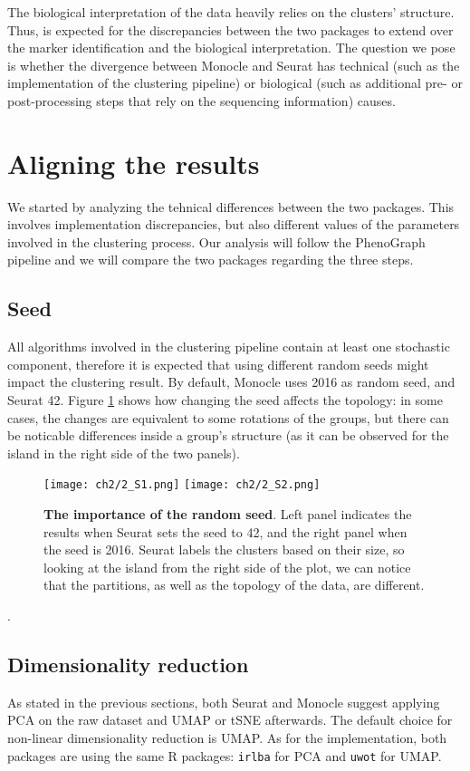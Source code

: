 The biological interpretation of the data heavily relies on the clusters' structure. Thus, is expected for the discrepancies between the two packages to extend over the marker identification and the biological interpretation. The question we pose is whether the divergence between Monocle and Seurat has technical (such as the implementation of the clustering pipeline) or biological (such as additional pre- or post-processing steps that rely on the sequencing information) causes.

\section{Aligning the results}
We started by analyzing the tehnical differences between the two packages. This involves implementation discrepancies, but also different values of the parameters involved in the clustering process. Our analysis will follow the PhenoGraph pipeline and we will compare the two packages regarding the three steps.

\subsection{Seed}
All algorithms involved in the clustering pipeline contain at least one stochastic component, therefore it is expected that using different random seeds might impact the clustering result. By default, Monocle uses 2016 as random seed, and Seurat 42. Figure \ref{fig:s4-m3-seed} shows how changing the seed affects the topology: in some cases, the changes are equivalent to some rotations of the groups, but there can be noticable differences inside a group's structure (as it can be observed for the island in the right side of the two panels).

\begin{figure}[H]
    \centering
    \texttt{[image: ch2/2\_S1.png]}
    \texttt{[image: ch2/2\_S2.png]}
    \caption{\label{fig:s4-m3-seed}\textbf{The importance of the random seed}. Left panel indicates the results when Seurat sets the seed to 42, and the right panel when the seed is 2016. Seurat labels the clusters based on their size, so looking at the island from the right side of the plot, we can notice that the partitions, as well as the topology of the data, are different. }
\end{figure}.

\subsection{Dimensionality reduction}
As stated in the previous sections, both Seurat and Monocle suggest applying PCA on the raw dataset and UMAP or tSNE afterwards. The default choice for non-linear dimensionality reduction is UMAP. As for the implementation, both packages are using the same R packages: \verb|irlba| for PCA \cite{Baglama2016IRLBAFP} and \verb|uwot| for UMAP.


